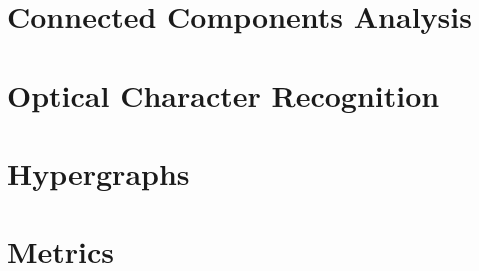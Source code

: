 \section{Connected Components Analysis}


\section{Optical Character Recognition}

\section{Hypergraphs}

\section{Metrics}

